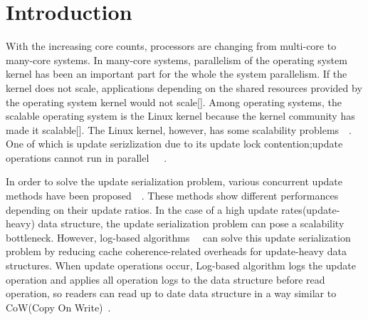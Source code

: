 \section{Introduction} \label{sec:introduction}

With the increasing core counts, processors are changing from multi-core to
many-core systems.
In many-core systems, parallelism of the operating system kernel has been an
important part for the whole the system parallelism.
If the kernel does not scale, applications depending on the shared
resources provided by the operating system kernel would not scale[].
Among operating systems, the scalable operating system is the Linux kernel
because the kernel community has made it scalable[].
The Linux kernel, however, has some scalability
problems~\cite{SilasBoydWickizer2010LinuxScales48}~\cite{Changwoo2016UMSF}.
One of which is update serizlization due to its update lock
contention;update operations cannot run in
parallel~\cite{mckenney2011parallel}~\cite{Matveev2015RLU}~\cite{Dodds2015SCT}.

In order to solve the update serialization problem, various concurrent update
methods have been proposed~\cite{Arbel2014ConcurrentRCU}~\cite{Matveev2015RLU}.
These methods show different performances depending on their update ratios.
In the case of a high update rates(update-heavy) data structure, the
update serialization problem can pose a scalability bottleneck.
However, log-based algorithms~\cite{Hendler2010FC}~\cite{SilasBoydWickizerPth}
can solve this update serialization problem by reducing cache coherence-related
overheads for update-heavy data structures.
When update operations occur, Log-based algorithm logs the update
operation and applies all operation logs to the data structure
before read operation, so readers can read up to date data structure in a way
similar to CoW(Copy On Write)~\cite{PaulDetailLWN}.

